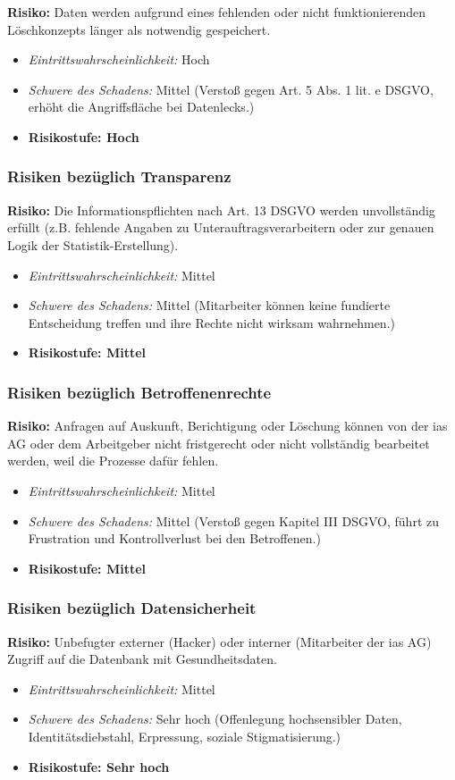 \documentclass[12pt, a4paper]{article}
\begin{document}
\textbf{Risiko:} Daten werden aufgrund eines fehlenden oder nicht funktionierenden Löschkonzepts länger als notwendig gespeichert.
\begin{itemize}
    \item \textit{Eintrittswahrscheinlichkeit:} Hoch
    \item \textit{Schwere des Schadens:} Mittel (Verstoß gegen Art. 5 Abs. 1 lit. e DSGVO, erhöht die Angriffsfläche bei Datenlecks.)
    \item \textbf{Risikostufe: Hoch}
\end{itemize}

\subsubsection{Risiken bezüglich Transparenz}
\textbf{Risiko:} Die Informationspflichten nach Art. 13 DSGVO werden unvollständig erfüllt (z.B. fehlende Angaben zu Unterauftragsverarbeitern oder zur genauen Logik der Statistik-Erstellung).
\begin{itemize}
    \item \textit{Eintrittswahrscheinlichkeit:} Mittel
    \item \textit{Schwere des Schadens:} Mittel (Mitarbeiter können keine fundierte Entscheidung treffen und ihre Rechte nicht wirksam wahrnehmen.)
    \item \textbf{Risikostufe: Mittel}
\end{itemize}

\subsubsection{Risiken bezüglich Betroffenenrechte}
\textbf{Risiko:} Anfragen auf Auskunft, Berichtigung oder Löschung können von der ias AG oder dem Arbeitgeber nicht fristgerecht oder nicht vollständig bearbeitet werden, weil die Prozesse dafür fehlen.
\begin{itemize}
    \item \textit{Eintrittswahrscheinlichkeit:} Mittel
    \item \textit{Schwere des Schadens:} Mittel (Verstoß gegen Kapitel III DSGVO, führt zu Frustration und Kontrollverlust bei den Betroffenen.)
    \item \textbf{Risikostufe: Mittel}
\end{itemize}

\subsubsection{Risiken bezüglich Datensicherheit}
\textbf{Risiko:} Unbefugter externer (Hacker) oder interner (Mitarbeiter der ias AG) Zugriff auf die Datenbank mit Gesundheitsdaten.
\begin{itemize}
    \item \textit{Eintrittswahrscheinlichkeit:} Mittel
    \item \textit{Schwere des Schadens:} Sehr hoch (Offenlegung hochsensibler Daten, Identitätsdiebstahl, Erpressung, soziale Stigmatisierung.)
    \item \textbf{Risikostufe: Sehr hoch}
\end{itemize}
\end{document}
